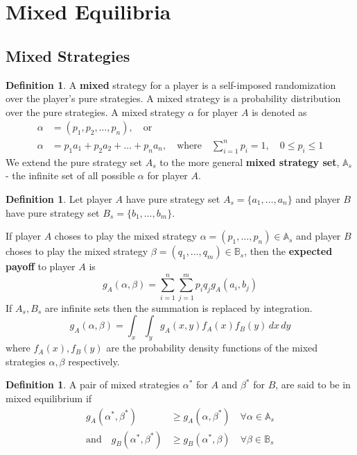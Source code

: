 \documentclass[11pt]{article}
\theoremstyle{plain}
\theoremstyle{definition}
\newtheorem{definition}[theorem]{Definition}
\theoremstyle{remark}
\begin{document}
\section{Mixed Equilibria}

\subsection{Mixed Strategies}

\setcounter{theorem}{15} 
\begin{definition}
    A \textbf{mixed} strategy for a player is a self-imposed randomization over the player's pure strategies. A mixed strategy is a probability distribution over the pure strategies.
    A mixed strategy \(\alpha\) for player \(A\) is denoted as
    \begin{align*}
        \alpha &= (p_1, p_2, \ldots , p_n), \quad \text{or} \\
        \alpha &= p_1 a_1 + p_2 a_2 + \ldots + p_n a_n, \quad \text{where} \quad \sum_{i=1}^{n} p_i = 1, \quad 0 \leq p_i \leq 1
    \end{align*}
    We extend the pure strategy set \(A_{s}\) to the more general \textbf{mixed strategy set}, \(\mathbb{A}_{s}\) - the infinite set of all possible \(\alpha \) for player \(A\).
\end{definition}

\begin{definition}
    Let player \(A\) have pure strategy set \(A_{s} = \{a_1, \ldots , a_{n}  \}\) and player \(B\) have pure strategy set \(B_{s} = \{b_1, \ldots , b_{m}  \}\).

    If player \(A\) choses to play the mixed strategy \(\alpha = (p_1, \ldots , p_{n}  ) \in \mathbb{A}_{s}\) and player \(B\) choses to play the mixed strategy \(\beta = (q_1, \ldots , q_{m}  ) \in \mathbb{B}_{s}\), then the \textbf{expected payoff} to player \(A\) is
    \[
        g_{A}(\alpha,\beta) = \sum_{i=1}^{n} \sum_{j=1}^{m} p_i q_j g_{A}(a_i,b_j)
    \]
    If \(A_{s}, B_{s}\) are infinite sets then the summation is replaced by integration.
    \[
        g_{A}(\alpha ,\beta ) = \int_{x} \int_{y} g_{A}(x,y) f_{A}(x) f_{B}(y)\, dx \, dy
    \]
    where \(f_{A}(x), f_{B}(y)\) are the probability density functions of the mixed strategies \(\alpha, \beta \) respectively.
\end{definition}

\setcounter{theorem}{18} 
\begin{definition}
    A pair of mixed strategies \(\alpha^{\ast}\) for \(A\) and \(\beta^{\ast} \) for \(B\), are said to be in mixed equilibrium if
    \begin{align*}
        g_{A}(\alpha^{\ast},\beta^{\ast}) &\geq g_{A}(\alpha,\beta^{\ast}) \quad \forall \alpha \in \mathbb{A}_{s} \\
        \text{and} \quad g_{B}(\alpha^{\ast},\beta^{\ast}) &\geq g_{B}(\alpha^{\ast},\beta) \quad \forall \beta \in \mathbb{B}_{s}
    \end{align*}
\end{definition}
\end{document}
